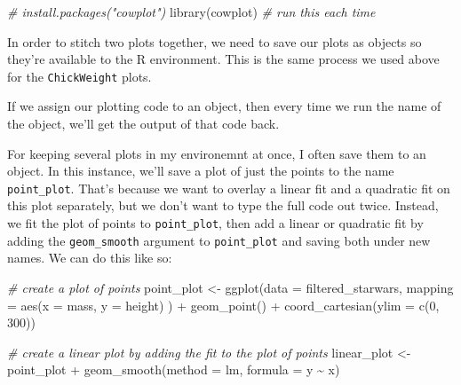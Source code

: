 \documentclass[
]{book}
\newenvironment{Shaded}{\begin{snugshade}}{\end{snugshade}}
\newcommand{\AttributeTok}[1]{\textcolor[rgb]{0.77,0.63,0.00}{#1}}
\newcommand{\CommentTok}[1]{\textcolor[rgb]{0.56,0.35,0.01}{\textit{#1}}}
\newcommand{\DecValTok}[1]{\textcolor[rgb]{0.00,0.00,0.81}{#1}}
\newcommand{\FunctionTok}[1]{\textcolor[rgb]{0.00,0.00,0.00}{#1}}
\newcommand{\NormalTok}[1]{#1}
\newcommand{\OtherTok}[1]{\textcolor[rgb]{0.56,0.35,0.01}{#1}}
\newcommand{\SpecialCharTok}[1]{\textcolor[rgb]{0.00,0.00,0.00}{#1}}
\newcommand{\StringTok}[1]{\textcolor[rgb]{0.31,0.60,0.02}{#1}}
\begin{document}
\begin{Shaded}
\begin{Highlighting}[]
\CommentTok{\# install.packages("cowplot")}
\FunctionTok{library}\NormalTok{(cowplot) }\CommentTok{\# run this each time}
\end{Highlighting}
\end{Shaded}

In order to stitch two plots together, we need to save our plots as objects so they're available to the R environment. This is the same process we used above for the \texttt{ChickWeight} plots.

If we assign our plotting code to an object, then every time we run the name of the object, we'll get the output of that code back.

For keeping several plots in my environemnt at once, I often save them to an object. In this instance, we'll save a plot of just the points to the name \texttt{point\_plot}. That's because we want to overlay a linear fit and a quadratic fit on this plot separately, but we don't want to type the full code out twice. Instead, we fit the plot of points to \texttt{point\_plot}, then add a linear or quadratic fit by adding the \texttt{geom\_smooth} argument to \texttt{point\_plot} and saving both under new names. We can do this like so:

\begin{Shaded}
\begin{Highlighting}[]
\CommentTok{\# create a plot of points}
\NormalTok{point\_plot }\OtherTok{\textless{}{-}} \FunctionTok{ggplot}\NormalTok{(}\AttributeTok{data =}\NormalTok{ filtered\_starwars, }
                     \AttributeTok{mapping =} \FunctionTok{aes}\NormalTok{(}\AttributeTok{x =}\NormalTok{ mass, }\AttributeTok{y =}\NormalTok{ height)}
\NormalTok{                     ) }\SpecialCharTok{+}
  \FunctionTok{geom\_point}\NormalTok{() }\SpecialCharTok{+}
  \FunctionTok{coord\_cartesian}\NormalTok{(}\AttributeTok{ylim =} \FunctionTok{c}\NormalTok{(}\DecValTok{0}\NormalTok{, }\DecValTok{300}\NormalTok{))}

\CommentTok{\# create a linear plot by adding the fit to the plot of points}
\NormalTok{linear\_plot }\OtherTok{\textless{}{-}}\NormalTok{  point\_plot }\SpecialCharTok{+} 
  \FunctionTok{geom\_smooth}\NormalTok{(}\AttributeTok{method =} \StringTok{\textquotesingle{}lm\textquotesingle{}}\NormalTok{, }\AttributeTok{formula =}\NormalTok{ y }\SpecialCharTok{\textasciitilde{}}\NormalTok{ x)}
\end{Highlighting}
\end{Shaded}
\end{document}
